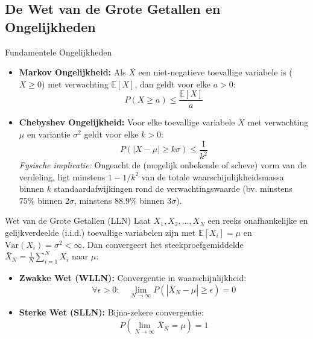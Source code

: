 \documentclass[11pt,a4paper]{article}
\newcommand{\E}{\mathbb{E}}
\newcommand{\Var}{\text{Var}}
\begin{document}
\subsection{De Wet van de Grote Getallen en Ongelijkheden}
\begin{theobox}{Fundamentele Ongelijkheden}
\begin{itemize}[leftmargin=1.2em]
    \item \textbf{Markov Ongelijkheid:} Als $X$ een niet-negatieve toevallige variabele is ($X \ge 0$) met verwachting $\E[X]$, dan geldt voor elke $a > 0$:
    \begin{equation}
        P(X \ge a) \le \frac{\E[X]}{a}
    \end{equation}
    \item \textbf{Chebyshev Ongelijkheid:} Voor elke toevallige variabele $X$ met verwachting $\mu$ en variantie $\sigma^2$ geldt voor elke $k > 0$:
    \begin{equation}
        P(|X - \mu| \ge k\sigma) \le \frac{1}{k^2}
    \end{equation}
    \emph{Fysische implicatie:} Ongeacht de (mogelijk onbekende of scheve) vorm van de verdeling, ligt minstens $1 - 1/k^2$ van de totale waarschijnlijkheidsmassa binnen $k$ standaardafwijkingen rond de verwachtingswaarde (bv. minstens $75\%$ binnen $2\sigma$, minstens $88.9\%$ binnen $3\sigma$).
\end{itemize}
\end{theobox}

\begin{theobox}{Wet van de Grote Getallen (LLN)}
Laat $X_1, X_2, \ldots, X_N$ een reeks onafhankelijke en gelijkverdeelde (i.i.d.) toevallige variabelen zijn met $\E[X_i] = \mu$ en $\Var(X_i) = \sigma^2 < \infty$. Dan convergeert het steekproefgemiddelde $\bar{X}_N = \frac{1}{N}\sum_{i=1}^N X_i$ naar $\mu$:
\begin{itemize}
    \item \textbf{Zwakke Wet (WLLN):} Convergentie in waarschijnlijkheid:
    \begin{equation}
        \forall \epsilon > 0: \quad \lim_{N \to \infty} P(|\bar{X}_N - \mu| \ge \epsilon) = 0
    \end{equation}
    \item \textbf{Sterke Wet (SLLN):} Bijna-zekere convergentie:
    \begin{equation}
        P\left( \lim_{N \to \infty} \bar{X}_N = \mu \right) = 1
    \end{equation}
\end{itemize}
\end{theobox}
\end{document}
